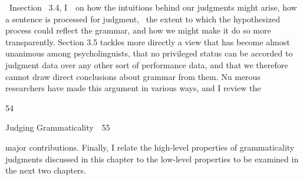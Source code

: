 \begin{styleStandard}
  [Warning: Image ignored] %
  \ Insection \ 3.4, I\ \ on how the intuitions behind our judgments might arise, how a sentence is processed for judgment, \ the extent to which the hypothesized process could reflect the grammar, and how we might make it do so more transparently. Section 3.5 tackles more directly a view that has become almost unanimous among psycholinguists, that no privileged status can be accorded to judgment data over any other sort of performance data, and that we therefore cannot draw direct conclusions about grammar from them. Nu\- merous researchers have made this argument in various ways, and I review the
\end{styleStandard}


\begin{styleStandard}
54
\end{styleStandard}


\clearpage\setcounter{page}{1}\begin{styleStandard}
Judging Grammaticality\ \ 55
\end{styleStandard}


\begin{styleTextbody}
major contributions. Finally, I relate the high-level properties of grammaticality judgments discussed in this chapter to the low-level properties to be examined in the next two chapters.
\end{styleTextbody}


